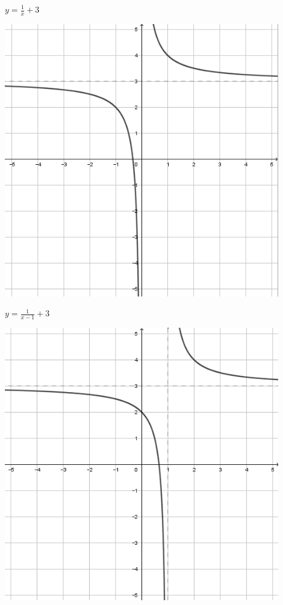 \documentclass[a4paper]{oblivoir}
\begin{document}
\begin{minipage}{0.45\textwidth}\centering
\(y=\frac1x+3\)
\par\bigskip\includegraphics[width=0.9\textwidth]{img/20-3}
\end{minipage}
\begin{minipage}{0.45\textwidth}\centering
\(y=\frac1{x-1}+3\)
\par\bigskip\includegraphics[width=0.9\textwidth]{img/20-4}
\end{minipage}\bigskip\bigskip\par
\end{document}
